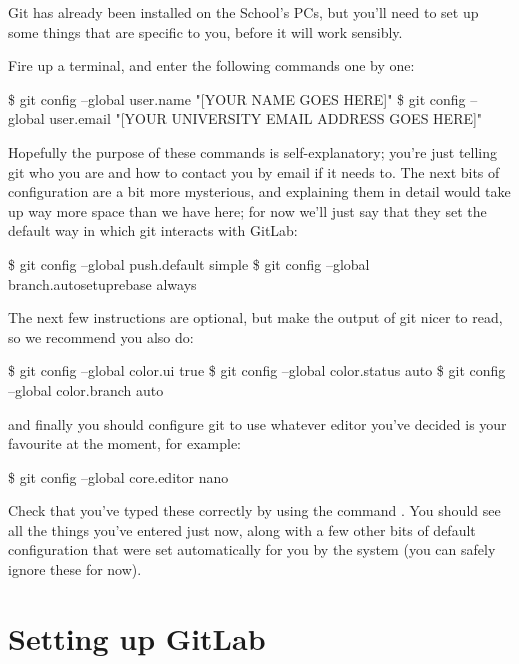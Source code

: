 Git has already been installed on the School's PCs, but you'll need to set up some things that are specific to you, before it will work sensibly. 

Fire up a terminal, and enter the following commands one by one:

\begin{ttoutenv}
\$ git config --global user.name "[YOUR NAME GOES HERE]"
\$ git config --global user.email "[YOUR UNIVERSITY EMAIL ADDRESS GOES HERE]" 
\end{ttoutenv}

Hopefully the purpose of these commands is self-explanatory; you're just telling git who you are and how to contact you by email if it needs to. The next bits of configuration are a bit more mysterious, and explaining them in detail would take up way more space than we have here; for now we'll just say that they set the default way in which git interacts with GitLab:

\begin{ttoutenv}
\$ git config --global push.default simple
\$ git config --global branch.autosetuprebase always 
\end{ttoutenv}

The next few instructions are optional, but make the output of git nicer to read, so we recommend you also do:

\begin{ttoutenv}
\$ git config --global color.ui true
\$ git config --global color.status auto
\$ git config --global color.branch auto 
\end{ttoutenv}

and finally you should configure git to use whatever editor you've decided is your favourite at the moment, for example:

\begin{ttoutenv}
\$ git config --global core.editor nano 
\end{ttoutenv}

Check that you've typed these correctly by using the command . You should see all the things you've entered just now, along with a few other bits of default configuration that were set automatically for you by the system (you can safely ignore these for now).

\section{Setting up GitLab}


